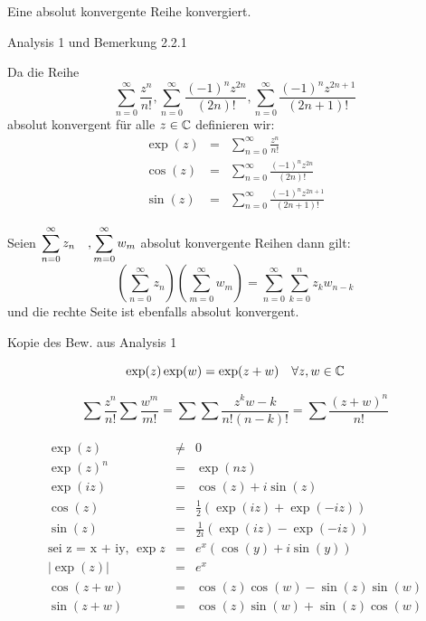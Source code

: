 \begin{satz}
Eine absolut konvergente Reihe konvergiert.
\end{satz}
\begin{bew}
Analysis 1 und Bemerkung 2.2.1
\end{bew}

\begin{definition}
Da die Reihe
\[
\sum^\infty_{n=0} \frac{z^n}{n!}, \sum^\infty_{n=0} \frac{(-1)^n z^{2n}}{(2n)!}, \sum^\infty_{n=0} \frac{(-1)^nz^{2n+1}}{(2n+1)!}
\]
absolut konvergent für alle $z \in \mathbb{C}$ definieren wir: \\
\begin{eqnarray*}
	\exp(z) &=& \sum^\infty_{n=0} \frac{z^n}{n!} \\
	\cos(z) &=& \sum^\infty_{n=0} \frac{(-1)^n z^{2n}}{(2n)!} \\
	\sin(z) &=& \sum^\infty_{n=0} \frac{(-1)^nz^{2n+1}}{(2n+1)!}
\end{eqnarray*}
\end{definition}

\begin{lemma}

Seien $\begin{displaystyle}
\sum^\infty_{n=0} z_n \quad ,\sum^\infty_{m=0} w_m
\end{displaystyle}$ absolut konvergente Reihen dann gilt:
\[
(\sum^\infty_{n=0} z_n)(\sum^\infty_{m=0} w_m) = \sum^\infty_{n=0} \sum^n_{k=0} z_k w_{n-k}
\]
und die rechte Seite ist ebenfalls absolut konvergent.
\end{lemma}
\begin{bew}
Kopie des Bew. aus Analysis 1
\end{bew}

\begin{satz}
\[
\exp(z) \exp(w) = \exp(z+w)\quad \forall z,w \in \mathbb{C}
\]
\end{satz}
\begin{bew}
\[
\sum \frac{z^n}{n!} \sum \frac{w^m}{m!} = \sum \sum \frac{z^kw-k}{n!(n-k)!} = \sum \frac{(z+w)^n}{n!}
\]
\end{bew}

\begin{korollar}\label{korollar1}
	\begin{eqnarray*}
		\exp(z) &\neq& 0\\
		\exp(z)^n &=& \exp(nz)\\
		\exp(iz) &=& \cos(z) + i \sin(z)\\
		\cos(z) &=& \frac{1}{2} (\exp(iz)+\exp(-iz))\\
		\sin(z) &=& \frac{1}{2i} (\exp(iz)-\exp(-iz))\\
		\text{sei z = x + iy, } \exp z &=& e^x ( \cos(y) + i \sin(y)) \\
		|\exp(z) | &=& e^x\\
		\cos(z+w) &=& \cos(z)\cos(w) - \sin(z) \sin(w)\\
		\sin(z+w) &=& \cos(z) \sin(w) + \sin(z) \cos(w)
	\end{eqnarray*}
\end{korollar}

